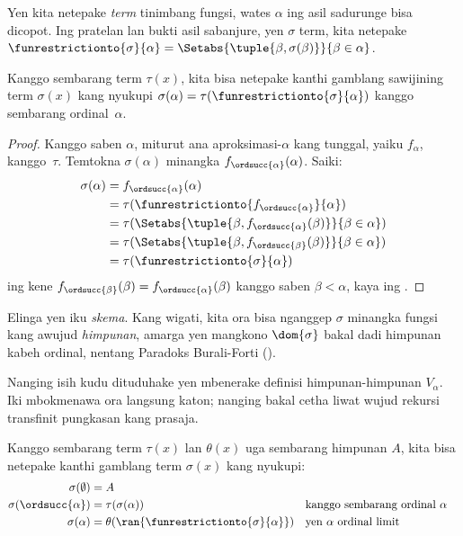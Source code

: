 \documentclass[../../../include/open-logic-section]{subfiles}
\begin{document}
Yen kita netepake \emph{term} tinimbang fungsi,
wates $\alpha$ ing asil sadurunge bisa dicopot.
Ing pratelan lan bukti asil sabanjure, yen $\sigma$
term, kita netepake
$\funrestrictionto{\sigma}{\alpha}
= \Setabs{\tuple{\beta, \sigma(\beta)}}{\beta \in \alpha}$.

\begin{thm}
Kanggo sembarang term $\tau(x)$, kita bisa netepake
kanthi gamblang sawijining term $\sigma(x)$ kang
nyukupi $\sigma(\alpha)
= \tau(\funrestrictionto{\sigma}{\alpha})$
kanggo sembarang ordinal~$\alpha$.
\end{thm}

\begin{proof}
Kanggo saben $\alpha$, miturut
 ana aproksimasi-$\alpha$
kang tunggal, yaiku $f_\alpha$, kanggo~$\tau$.
Temtokna $\sigma(\alpha)$ minangka
$f_{\ordsucc{\alpha}}(\alpha)$. Saiki:
	\begin{align*}
		\sigma(\alpha) &= 
		f_{\ordsucc{\alpha}}(\alpha) \\&= 
		\tau(\funrestrictionto{f_{\ordsucc{\alpha}}}{\alpha}) \\&= 
		\tau(\Setabs{\tuple{\beta, f_{\ordsucc{\alpha}}(\beta)}}{\beta \in \alpha}) \\&= 
		\tau(\Setabs{\tuple{\beta, f_{\ordsucc{\beta}}(\beta)}}{\beta \in \alpha})\\&=
		\tau(\funrestrictionto{\sigma}{\alpha})
	\end{align*}
ing kene $f_{\ordsucc{\beta}}(\beta)
= f_{\ordsucc{\alpha}}(\beta)$ kanggo saben
$\beta < \alpha$, kaya ing
.
\end{proof}
\noindent 
Elinga yen  iku
\emph{skema}. Kang wigati, kita ora bisa nganggep
$\sigma$ minangka fungsi kang awujud \emph{himpunan},
amarga yen mangkono $\dom{\sigma}$ bakal dadi
himpunan kabeh ordinal, nentang Paradoks Burali-Forti
().

Nanging isih kudu dituduhake yen
 mbenerake definisi
himpunan-himpunan $V_\alpha$. Iki mbokmenawa ora
langsung katon; nanging bakal cetha liwat wujud
rekursi transfinit pungkasan kang prasaja.

\begin{thm}
Kanggo sembarang term $\tau(x)$ lan $\theta(x)$
uga sembarang himpunan $A$, kita bisa netepake
kanthi gamblang term $\sigma(x)$ kang nyukupi:
\begin{align*}
	\sigma(\emptyset) &= A\\
	\sigma(\ordsucc{\alpha}) &= \tau(\sigma(\alpha)) &&
		\text{kanggo sembarang ordinal }\alpha\\
	\sigma(\alpha) &= \theta(\ran{\funrestrictionto{\sigma}{\alpha}})&&
	\text{yen }\alpha\text{ ordinal limit}
\end{align*}
\end{thm}
\end{document}
